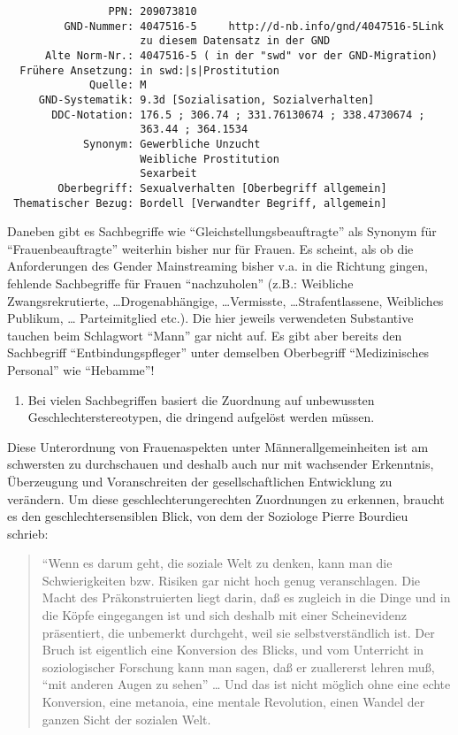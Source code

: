 \documentclass[a4paper,
fontsize=11pt,
oneside,
numbers=noperiodatend,
parskip=half-,
bibliography=totoc,
final
]{scrartcl}
\begin{document}
\begin{verbatim}
                PPN: 209073810
         GND-Nummer: 4047516-5     http://d-nb.info/gnd/4047516-5Link
                     zu diesem Datensatz in der GND
      Alte Norm-Nr.: 4047516-5 ( in der "swd" vor der GND-Migration)
  Frühere Ansetzung: in swd:|s|Prostitution
             Quelle: M
     GND-Systematik: 9.3d [Sozialisation, Sozialverhalten]
       DDC-Notation: 176.5 ; 306.74 ; 331.76130674 ; 338.4730674 ;
                     363.44 ; 364.1534
            Synonym: Gewerbliche Unzucht
                     Weibliche Prostitution
                     Sexarbeit
        Oberbegriff: Sexualverhalten [Oberbegriff allgemein]
 Thematischer Bezug: Bordell [Verwandter Begriff, allgemein]
\end{verbatim}

Daneben gibt es Sachbegriffe wie \enquote{Gleichstellungsbeauftragte}
als Synonym für \enquote{Frauenbeauftragte} weiterhin bisher nur für
Frauen. Es scheint, als ob die Anforderungen des Gender Mainstreaming
bisher v.a. in die Richtung gingen, fehlende Sachbegriffe für Frauen
\enquote{nachzuholen} (z.B.: Weibliche Zwangsrekrutierte,
\ldots{}Drogenabhängige, \ldots{}Vermisste, \ldots{}Strafentlassene,
Weibliches Publikum, \ldots{} Parteimitglied etc.). Die hier jeweils
verwendeten Substantive tauchen beim Schlagwort \enquote{Mann} gar nicht
auf. Es gibt aber bereits den Sachbegriff \enquote{Entbindungspfleger}
unter demselben Oberbegriff \enquote{Medizinisches Personal} wie
\enquote{Hebamme}!

\begin{enumerate}
\def\labelenumi{\arabic{enumi}.}
\setcounter{enumi}{2}
\itemsep1pt\parskip0pt
\item
  Bei vielen Sachbegriffen basiert die Zuordnung auf unbewussten
  Geschlechterstereotypen, die dringend aufgelöst werden müssen.
\end{enumerate}

Diese Unterordnung von Frauenaspekten unter Männerallgemeinheiten ist am
schwersten zu durchschauen und deshalb auch nur mit wachsender
Erkenntnis, Überzeugung und Voranschreiten der gesellschaftlichen
Entwicklung zu verändern. Um diese geschlechterungerechten Zuordnungen
zu erkennen, braucht es den geschlechtersensiblen Blick, von dem der
Soziologe Pierre Bourdieu schrieb:

\begin{quote}
``Wenn es darum geht, die soziale Welt zu denken, kann man die
Schwierigkeiten bzw. Risiken gar nicht hoch genug veranschlagen. Die
Macht des Präkonstruierten liegt darin, daß es zugleich in die Dinge und
in die Köpfe eingegangen ist und sich deshalb mit einer Scheinevidenz
präsentiert, die unbemerkt durchgeht, weil sie selbstverständlich ist.
Der Bruch ist eigentlich eine Konversion des Blicks, und vom Unterricht
in soziologischer Forschung kann man sagen, daß er zuallererst lehren
muß, \enquote{mit anderen Augen zu sehen} \ldots{} Und das ist nicht
möglich ohne eine echte Konversion, eine metanoia, eine mentale
Revolution, einen Wandel der ganzen Sicht der sozialen Welt.
\end{quote}
\end{document}
